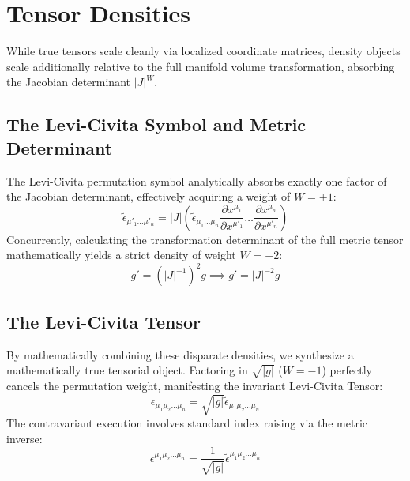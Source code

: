 \documentclass[11pt, a4paper]{report}
\begin{document}
\section{Tensor Densities}
While true tensors scale cleanly via localized coordinate matrices, density objects scale additionally relative to the full manifold volume transformation, absorbing the Jacobian determinant $|J|^W$. 

\subsection*{The Levi-Civita Symbol and Metric Determinant}
The Levi-Civita permutation symbol analytically absorbs exactly one factor of the Jacobian determinant, effectively acquiring a weight of $W=+1$:
\begin{equation} \tilde{\epsilon}_{\mu'_1 \dots \mu'_n} = |J| \left( \tilde{\epsilon}_{\mu_1 \dots \mu_n} \frac{\partial x^{\mu_1}}{\partial x^{\mu'_1}} \dots \frac{\partial x^{\mu_n}}{\partial x^{\mu'_n}} \right) \end{equation}
Concurrently, calculating the transformation determinant of the full metric tensor mathematically yields a strict density of weight $W=-2$:
\begin{equation} g' = (|J|^{-1})^2 g \implies g' = |J|^{-2} g \end{equation}

\subsection*{The Levi-Civita Tensor}
By mathematically combining these disparate densities, we synthesize a mathematically true tensorial object. Factoring in $\sqrt{|g|}$ ($W=-1$) perfectly cancels the permutation weight, manifesting the invariant Levi-Civita Tensor:
\begin{equation} \epsilon_{\mu_1\mu_2\dots\mu_n} = \sqrt{|g|} \tilde{\epsilon}_{\mu_1\mu_2\dots\mu_n} \end{equation}
The contravariant execution involves standard index raising via the metric inverse:
\begin{equation} \epsilon^{\mu_1\mu_2\dots\mu_n} = \frac{1}{\sqrt{|g|}} \tilde{\epsilon}^{\mu_1\mu_2\dots\mu_n} \end{equation}
\end{document}
